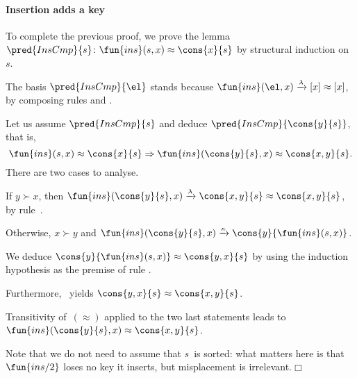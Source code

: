 \paragraph{Insertion adds a key}

To complete the previous proof, we prove the
lemma \(\pred{InsCmp}{s} \colon
\fun{ins}(s,x) \approx \cons{x}{s}\) by structural induction on~\(s\).
\begin{itemize*}

  \item The basis \(\pred{InsCmp}{\el}\) stands because
    \(\fun{ins}(\el,x) \xrightarrow{\smash{\lambda}} [x] \approx
          [x]\), by composing rules  and .

  \item Let us assume \(\pred{InsCmp}{s}\) and deduce
    \(\pred{InsCmp}{\cons{y}{s}}\), that is,
    \begin{equation*}
      \fun{ins}(s,x) \approx \cons{x}{s} \Rightarrow
      \fun{ins}(\cons{y}{s},x) \approx \cons{x,y}{s}.
    \end{equation*}
    There are two cases to analyse.
    \begin{itemize*}

    \item If \(y \succ x\), then \(\fun{ins}(\cons{y}{s},x)
      \xrightarrow{\smash{\lambda}} \cons{x,y}{s} \approx
      \cons{x,y}{s}\), by rule~.

    \item Otherwise, \(x \succ y\) and \(\fun{ins}(\cons{y}{s},x)
      \xrightarrow{\smash{\kappa}} \cons{y}{\fun{ins}(s,x)}\).
      \begin{itemize*}

        \item We deduce \(\cons{y}{\fun{ins}(s,x)} \approx
          \cons{y,x}{s}\) by using the induction hypothesis as the
          premise of rule .

        \item Furthermore, ~yields \(\cons{y,x}{s}
          \approx \cons{x,y}{s}\).

        \item Transitivity of~\((\approx)\) applied to the two last
          statements leads to \(\fun{ins}(\cons{y}{s},x) \approx
          \cons{x,y}{s}\).

      \end{itemize*}
      Note that we do not need to assume that \(s\)~is sorted: what
      matters here is that \(\fun{ins/2}\) loses no key it inserts,
      but misplacement is irrelevant.\hfill\(\Box\)

    \end{itemize*}

\end{itemize*}



